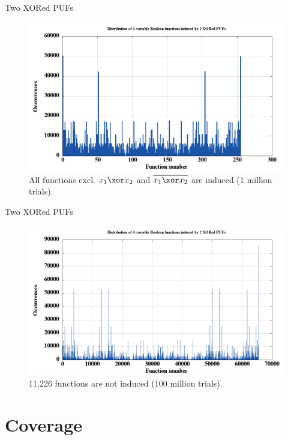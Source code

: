 \documentclass[10pt, compress]{beamer}
\begin{document}
\begin{frame}{Two XORed PUFs}
    \begin{figure}
        \centering
        \includegraphics[width=\textwidth]{figures/dist/distribution_of_3-variable_boolean_functions_induced_by_2_xored_pufs.png}
        \caption{All functions excl. $x_1 \xor x_2$ and $\overline{x_1 \xor x_2}$ are induced (1 million trials).}
    \end{figure}
\end{frame}

\begin{frame}{Two XORed PUFs}
    \begin{figure}
        \centering
        \includegraphics[width=\textwidth]{figures/dist/distribution_of_4-variable_boolean_functions_induced_by_2_xored_pufs.png}
        \caption{11,226 functions are not induced (100 million trials).}
    \end{figure}
\end{frame}

\section{Coverage}
\end{document}

